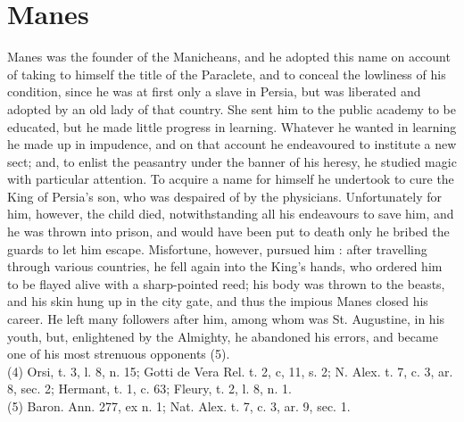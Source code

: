 \documentclass[12pt]{book}
\begin{document}
\section{Manes}
Manes was the founder of the Manicheans, and he adopted this name on account of taking to himself
the title of the Paraclete, and to conceal the lowliness of his condition, since he was at first only a slave in
Persia, but was liberated and adopted by an old lady of that country. She sent him to the public academy
to be educated, but he made little progress in learning. Whatever he wanted in learning he made up in
impudence, and on that account he endeavoured to institute a new sect; and, to enlist the peasantry
under the banner of his heresy, he studied magic with particular attention. To acquire a name for himself
he undertook to cure the King of Persia’s son, who was despaired of by the physicians. Unfortunately for
him, however, the child died, notwithstanding all his endeavours to save him, and he was thrown into
prison, and would have been put to death only he bribed the guards to let him escape. Misfortune,
however, pursued him : after travelling through various countries, he fell again into the King’s hands,
who ordered him to be flayed alive with a sharp-pointed reed; his body was thrown to the beasts, and his
skin hung up in the city gate, and thus the impious Manes closed his career. He left many followers after
him, among whom was St. Augustine, in his youth, but, enlightened by the Almighty, he abandoned his
errors, and became one of his most strenuous opponents (5).\\
(4) Orsi, t. 3, l. 8, n. 15; Gotti de Vera Rel. t. 2, c, 11, s. 2; N. Alex. t. 7, c. 3, ar. 8, sec. 2; Hermant, t. 1, c. 63;
Fleury, t. 2, l. 8, n. 1.\\
(5) Baron. Ann. 277, ex n. 1; Nat. Alex. t. 7, c. 3, ar. 9, sec. 1.\\
\end{document}
